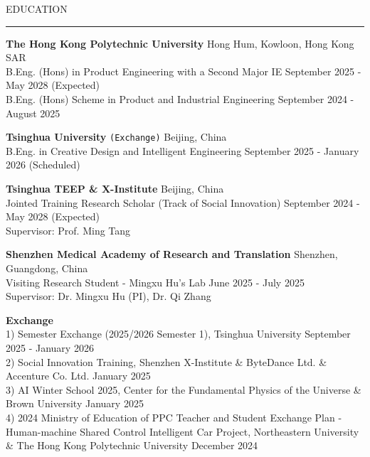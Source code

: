 \documentclass{resume} %
\renewenvironment{rSection}[1]{
\sectionskip
\textcolor{TsinghuaPurple}{\MakeUppercase{#1}}
\sectionlineskip
\hrule
\begin{list}{}{
\setlength{\leftmargin}{0em}
}
\item[]
}{
\end{list}
}
\begin{document}
  


\begin{rSection}{Education}
{\bf The Hong Kong Polytechnic University} \hfill {Hong Hum, Kowloon, Hong Kong SAR}\\
{B.Eng. (Hons) in Product Engineering with a Second Major IE} \hfill {September 2025 - May 2028 (Expected)}\\
{B.Eng. (Hons) Scheme in Product and Industrial Engineering} \hfill {September 2024 - August 2025}

{\bf Tsinghua University} \texttt{(Exchange)} \hfill {Beijing, China}\\
{B.Eng. in Creative Design and Intelligent Engineering} \hfill {September 2025 - January 2026 (Scheduled)}

{\bf Tsinghua TEEP \& X-Institute} \hfill {Beijing, China}\\
{Jointed Training Research Scholar (Track of Social Innovation)} \hfill {September 2024 - May 2028 (Expected)}\\
{Supervisor: Prof. Ming Tang}

{\bf Shenzhen Medical Academy of Research and Translation} \hfill {Shenzhen, Guangdong, China}\\
{Visiting Research Student - Mingxu Hu's Lab} \hfill {June 2025 - July 2025}\\
{Supervisor: Dr. Mingxu Hu (PI), Dr. Qi Zhang}

{\bf Exchange}\\
1)	Semester Exchange (2025/2026 Semester 1), Tsinghua University	\hfill {September 2025 - January 2026}\\
2)	Social Innovation Training, Shenzhen X-Institute \& ByteDance Ltd. \& Accenture Co. Ltd.	 \hfill {January 2025}\\
3)	AI Winter School 2025, Center for the Fundamental Physics of the Universe \& Brown University	 \hfill {January 2025}\\
4)	2024 Ministry of Education of PPC Teacher and Student Exchange Plan - Human-machine Shared Control Intelligent Car  Project, Northeastern University \& The Hong Kong Polytechnic University \hfill {December 2024}\\
\end{rSection} 
\end{document}
